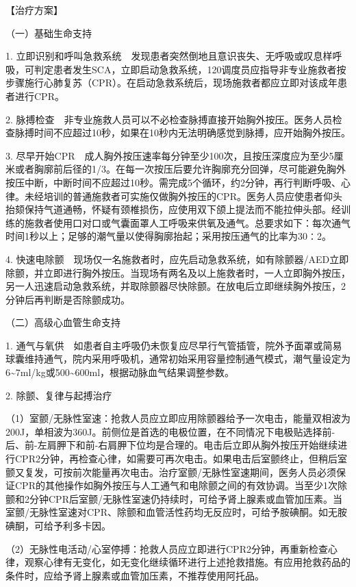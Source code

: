 【治疗方案】

{（一）基础生命支持}

1.
立即识别和呼叫急救系统　发现患者突然倒地且意识丧失、无呼吸或叹息样呼吸，可判定患者发生SCA，立即启动急救系统，120调度员应指导非专业施救者按步骤施行心肺复苏（CPR）。在启动急救系统后，现场施救者都应立即对该成年患者进行CPR。

2.
脉搏检查　非专业施救人员可以不必检查脉搏直接开始胸外按压。医务人员检查脉搏时间不应超过10秒，如果在10秒内无法明确感觉到脉搏，应开始胸外按压。

3.
尽早开始CPR　成人胸外按压速率每分钟至少100次，且按压深度应为至少5厘米或者胸廓前后径的1/3。在每一次按压后要允许胸廓充分回弹，尽可能避免胸外按压中断，中断时间不应超过10秒。需完成5个循环，约2分钟，再行判断呼吸、心律。未经培训的普通施救者可实施仅做胸外按压的CPR。医务人员应使患者仰头抬颏保持气道通畅，怀疑有颈椎损伤，应使用双下颌上提法而不能拉伸头部。经训练的施救者使用口对口或气囊面罩人工呼吸来供氧及通气。总要求如下：每次通气时间1秒以上；足够的潮气量以使得胸廓抬起；采用按压通气的比率为30∶2。

4.
快速电除颤　现场仅一名施救者时，应先启动急救系统，如有除颤器/AED立即除颤，并立即进行胸外按压。当现场有两名及以上施救者时，一人立即胸外按压，另一人迅速启动急救系统，并取除颤器尽快除颤。在放电后立即继续胸外按压，2分钟后再判断是否除颤成功。

{（二）高级心血管生命支持}

1.
通气与氧供　如患者自主呼吸仍未恢复应尽早行气管插管，院外予面罩或简易球囊维持通气，院内采用呼吸机，通常初始采用容量控制通气模式，潮气量设定为6\textasciitilde{}7ml/kg或500\textasciitilde{}600ml，根据动脉血气结果调整参数。

2. 除颤、复律与起搏治疗

（1）室颤/无脉性室速：抢救人员应立即应用除颤器给予一次电击，能量双相波为200J，单相波为360J。前侧位是首选的电极位置，在不同情况下电极贴选择前-后、前-左肩胛下和前-右肩胛下位均是合理的。电击后立即从胸外按压开始继续进行CPR2分钟，再检查心律，如需要可再次电击。如果电击后室颤终止，但稍后室颤又复发，可按前次能量再次电击。治疗室颤/无脉性室速期间，医务人员必须保证CPR的其他操作如胸外按压与人工通气和电除颤之间的有效协调。当至少1次除颤和2分钟CPR后室颤/无脉性室速仍持续时，可给予肾上腺素或血管加压素。当室颤/无脉性室速对CPR、除颤和血管活性药均无反应时，可给予胺碘酮。如无胺碘酮，可给予利多卡因。

（2）无脉性电活动/心室停搏：抢救人员应立即进行CPR2分钟，再重新检查心律，观察心律有无变化，如无变化继续循环进行上述抢救措施。有应用抢救药品的条件时，应给予肾上腺素或血管加压素，不推荐使用阿托品。

